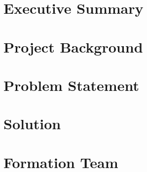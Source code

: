 \documentclass[12pt,a4paper]{report}
\begin{document}



\tableofcontents
\thispagestyle{empty}
\addtocounter{page}{-1}
\newpage


\chapter*{Executive Summary}
\label{introduction}


\chapter*{Project Background}
\label{literaturereview}


\chapter*{Problem Statement}
\label{relatedtheory}


\chapter*{Solution}
\label{feasiblity}


\chapter*{Formation Team}
\label{methodology}


\label{references}

\end{document}
